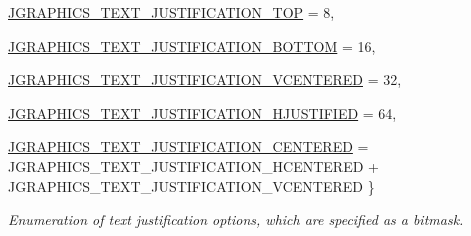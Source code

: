 \begin{DoxyCompactItemize}
\par
\hyperlink{group__jgraphics_gga3519fa317c6811b619af2d70e3c1eca7ab3d013abb01bb8b776878740c806be4f}{JGRAPHICS\_\-TEXT\_\-JUSTIFICATION\_\-TOP} =  8, 
\par
\hyperlink{group__jgraphics_gga3519fa317c6811b619af2d70e3c1eca7a5d435b07bee873341a742c66f27d1647}{JGRAPHICS\_\-TEXT\_\-JUSTIFICATION\_\-BOTTOM} =  16, 
\par
\hyperlink{group__jgraphics_gga3519fa317c6811b619af2d70e3c1eca7a38425ac2446ca233cc1c711d8ee531fe}{JGRAPHICS\_\-TEXT\_\-JUSTIFICATION\_\-VCENTERED} =  32, 
\par
\hyperlink{group__jgraphics_gga3519fa317c6811b619af2d70e3c1eca7a0adcc29443836c67fed75120d2c228ae}{JGRAPHICS\_\-TEXT\_\-JUSTIFICATION\_\-HJUSTIFIED} =  64, 
\par
\hyperlink{group__jgraphics_gga3519fa317c6811b619af2d70e3c1eca7a75d25a43e7cd127bf0baec24897e0f74}{JGRAPHICS\_\-TEXT\_\-JUSTIFICATION\_\-CENTERED} =  JGRAPHICS\_\-TEXT\_\-JUSTIFICATION\_\-HCENTERED + JGRAPHICS\_\-TEXT\_\-JUSTIFICATION\_\-VCENTERED
 \}
\begin{DoxyCompactList}\small\item\em Enumeration of text justification options, which are specified as a bitmask. \item\end{DoxyCompactList}\end{DoxyCompactItemize}
